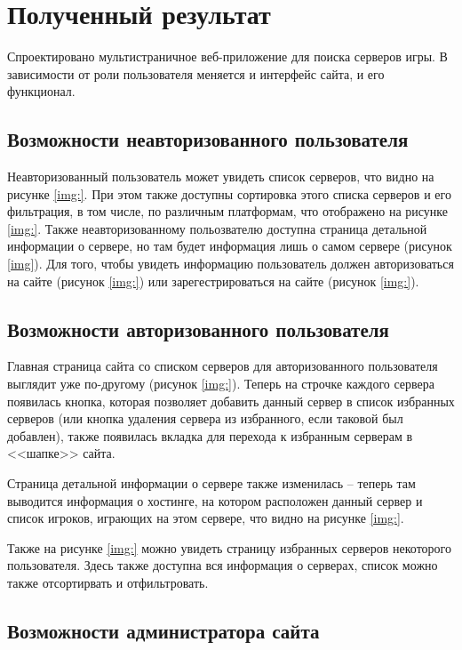 \section{Полученный результат}

Спроектировано мультистраничное веб-приложение для поиска серверов игры. В зависимости от роли пользователя меняется и интерфейс сайта, и его функционал.

\subsection{Возможности неавторизованного пользователя}

Неавторизованный пользователь может увидеть список серверов, что видно на рисунке \ref{img:}. При этом также доступны сортировка этого списка серверов и его фильтрация, в том числе, по различным платформам, что отображено на рисунке \ref{img:}. Также неавторизованному польозвателю доступна страница детальной информации о сервере, но там будет информация лишь о самом сервере (рисунок \ref{img}). Для того, чтобы увидеть информацию пользователь должен авторизоваться на сайте (рисунок \ref{img:}) или зарегестрироваться на сайте (рисунок \ref{img:}).

\subsection{Возможности авторизованного пользователя}

Главная страница сайта со списком серверов для авторизованного пользователя выглядит уже по-другому (рисунок \ref{img:}). Теперь на строчке каждого сервера появилась кнопка, которая позволяет добавить данный сервер в список избранных серверов (или кнопка удаления сервера из избранного, если таковой был добавлен), также появилась вкладка для перехода к избранным серверам в <<шапке>> сайта.

Страница детальной информации о сервере также изменилась -- теперь там выводится информация о хостинге, на котором расположен данный сервер и список игроков, играющих на этом сервере, что видно на рисунке \ref{img:}.

Также на рисунке \ref{img:} можно увидеть страницу избранных серверов некоторого пользователя. Здесь также доступна вся информация о серверах, список можно также отсортирвать и отфильтровать.

\subsection{Возможности администратора сайта}


